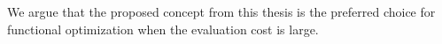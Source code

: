         We argue that the proposed concept from this thesis is the preferred choice for functional optimization when the evaluation cost is large.







